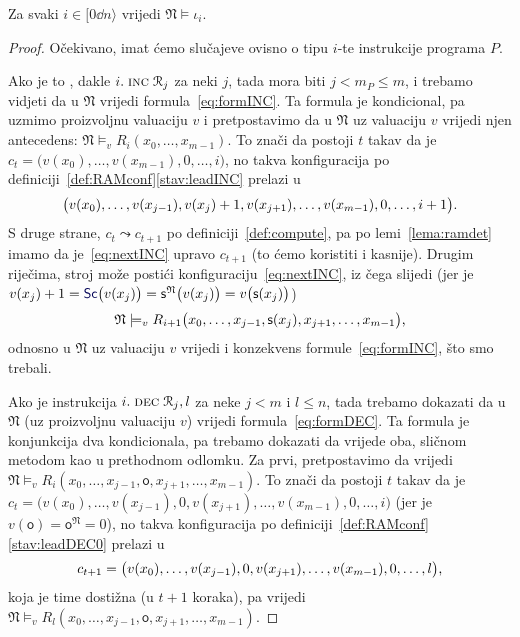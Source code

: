 \begin{lema}[{name=[istinitost instrukcijskih formula u $\mathfrak N$]}]\label{lm:Niotai}
Za svaki $i\in[0\dd n\rangle$ vrijedi $\mathfrak N\models\iota_i$.
\end{lema}
\begin{proof}
Očekivano, imat ćemo slučajeve ovisno o tipu $i$-te instrukcije programa $P$.

Ako je to \inc, dakle $i.\;\textsc{inc}\;\mathcal R_{j}$ za neki $j$, tada mora biti $j<m_P\le m$, i trebamo vidjeti da u $\mathfrak N$ vrijedi formula~\eqref{eq:formINC}. Ta formula je kondicional, pa uzmimo proizvoljnu valuaciju $v$ i pretpostavimo da u $\mathfrak N$ uz valuaciju $v$ vrijedi njen antecedens: $\mathfrak N\models_v R_i(x_0,\dotsc,x_{m-1})$. To znači da postoji $t$ takav da je $c_t=\bigl(v(x_0),\dotsc,v(x_{m-1}),0,\dotsc,i\bigr)$, no takva konfiguracija po definiciji~\ref{def:RAMconf}\eqref{stav:leadINC} prelazi u
\begin{equation}\label{eq:nextINC}
	\bigl(v(x_0),\dotsc,v(x_{j-1}),v(x_j)+1,v(x_{j+1}),\dotsc,v(x_{m-1}),0,\dotsc,i+1\bigr)\text.
\end{equation}
	S druge strane, $c_t\leadsto c_{t+1}$ po definiciji~\ref{def:compute}, pa po lemi~\ref{lema:ramdet} imamo da je~\eqref{eq:nextINC} upravo $c_{t+1}$ (to ćemo koristiti i kasnije). Drugim riječima, stroj može postići konfiguraciju~\eqref{eq:nextINC}, iz čega slijedi (jer je $v(x_j)+1=\f{Sc}\bigl(v(x_j)\bigr)=\mathsf s^{\mathfrak N}\bigl(v(x_j)\bigr)=v\bigl(\mathsf s(x_j)\bigr)$)
\begin{equation}
    \mathfrak N\models_v R_{i+1}\bigl(x_0,\dotsc,x_{j-1},\mathsf s(x_j),x_{j+1},\dotsc,x_{m-1}\bigr)\text,
\end{equation}
odnosno u $\mathfrak N$ uz valuaciju $v$ vrijedi i konzekvens formule~\eqref{eq:formINC}, što smo trebali.

	Ako je instrukcija $i.\;\textsc{dec}\;\mathcal R_{j},l$ za neke $j<m$ i $l\le n$, tada trebamo dokazati da u $\mathfrak N$ (uz proizvoljnu valuaciju $v$) vrijedi formula~\eqref{eq:formDEC}. Ta formula je konjunkcija dva kondicionala, pa trebamo dokazati da vrijede oba, sličnom metodom kao u prethodnom odlomku. Za prvi, pretpostavimo da vrijedi $\mathfrak N\models_v R_i(x_0,\dotsc,x_{j-1},\mathsf o,x_{j+1},\dotsc,x_{m-1})$. To znači da postoji $t$ takav da je $c_t=\bigl(v(x_0),\dotsc,v(x_{j-1}),0,v(x_{j+1}),\dotsc,v(x_{m-1}),0,\dotsc,i\bigr)$ (jer je $v(\mathsf o)=\mathsf o^{\mathfrak N}=0$), no takva konfiguracija po definiciji~\ref{def:RAMconf}\eqref{stav:leadDEC0} prelazi u
\begin{equation}
    c_{t+1}=\bigl(v(x_0),\dotsc,v(x_{j-1}),0,v(x_{j+1}),\dotsc,v(x_{m-1}),0,\dotsc,l\bigr)\text,
\end{equation}
koja je time dostižna (u $t+1$ koraka), pa vrijedi $\mathfrak N\models_v R_l(x_0,\dotsc,x_{j-1},\mathsf o,x_{j+1},\dotsc,x_{m-1})$.


\end{proof}
